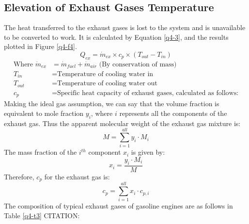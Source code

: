 \documentclass[11pt]{article}
\begin{document}
\subsection*{Elevation of Exhaust Gases Temperature}
The heat transferred to the exhaust gases is lost to the system and is unavailable to be converted to work. It is calculated by Equation \ref{q4-3}, and the results plotted in Figure \ref{q4-f4}.
\begin{equation}
Q_{ex} = \dot{m}_{ex} \times c_p \times (T_{out}-T_{in}) \label{q4-3}
\end{equation}
\begin{align*}
\textrm{Where }
\dot{m}_{ex}	&= \dot{m}_{fuel} + \dot{m}_{air} \textrm{ (By conservation of mass)}\\
T_{in}			&= \textrm{Temperature of cooling water in}\\ 
T_{out}			&= \textrm{Temperature of cooling water out}\\
c_p				&= \textrm{Specific heat capacity of exhaust gases, calculated as follows:}
\end{align*}
Making the ideal gas assumption, we can say that the volume fraction is equivalent to mole fraction $y_i$, where $i$ represents all the components of the exhaust gas. Thus the apparent molecular weight of the exhaust gas mixture is:
\begin{equation}
M = \sum\limits_{i=1}^{all} y_i \cdot M_i \label{q4-4}
\end{equation}
The mass fraction of the $i^{th}$ component $x_i$ is given by:
\begin{equation}
x_i= \frac{y_i \cdot M_i}{M} \label{q4-5}
\end{equation}
Therefore, $c_p$ for the exhaust gas is:
\begin{equation}
c_p = \sum \limits_{i=1}^{all} x_i \cdot c_{p,i} \label{q4-6}
\end{equation}
The composition of typical exhaust gases of gasoline engines are as follows in Table \ref{q4-t3} CITATION: 
\end{document}
